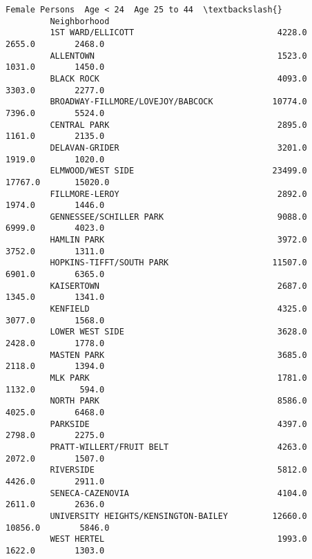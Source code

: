 \documentclass[11pt]{article}
\begin{document}
\begin{Verbatim}[commandchars=\\\{\}]
                                               Female Persons  Age < 24  Age 25 to 44  \textbackslash{}
         Neighborhood                                                                   
         1ST WARD/ELLICOTT                             4228.0    2655.0        2468.0   
         ALLENTOWN                                     1523.0    1031.0        1450.0   
         BLACK ROCK                                    4093.0    3303.0        2277.0   
         BROADWAY-FILLMORE/LOVEJOY/BABCOCK            10774.0    7396.0        5524.0   
         CENTRAL PARK                                  2895.0    1161.0        2135.0   
         DELAVAN-GRIDER                                3201.0    1919.0        1020.0   
         ELMWOOD/WEST SIDE                            23499.0   17767.0       15020.0   
         FILLMORE-LEROY                                2892.0    1974.0        1446.0   
         GENNESSEE/SCHILLER PARK                       9088.0    6999.0        4023.0   
         HAMLIN PARK                                   3972.0    3752.0        1311.0   
         HOPKINS-TIFFT/SOUTH PARK                     11507.0    6901.0        6365.0   
         KAISERTOWN                                    2687.0    1345.0        1341.0   
         KENFIELD                                      4325.0    3077.0        1568.0   
         LOWER WEST SIDE                               3628.0    2428.0        1778.0   
         MASTEN PARK                                   3685.0    2118.0        1394.0   
         MLK PARK                                      1781.0    1132.0         594.0   
         NORTH PARK                                    8586.0    4025.0        6468.0   
         PARKSIDE                                      4397.0    2798.0        2275.0   
         PRATT-WILLERT/FRUIT BELT                      4263.0    2072.0        1507.0   
         RIVERSIDE                                     5812.0    4426.0        2911.0   
         SENECA-CAZENOVIA                              4104.0    2611.0        2636.0   
         UNIVERSITY HEIGHTS/KENSINGTON-BAILEY         12660.0   10856.0        5846.0   
         WEST HERTEL                                   1993.0    1622.0        1303.0   
         

\end{Verbatim}
\end{document}
